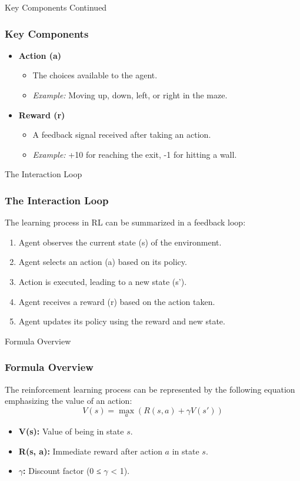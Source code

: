 \documentclass[aspectratio=169]{beamer}
\begin{document}
\begin{frame}[fragile]{Key Components Continued}
    \frametitle{Key Components}
    \begin{itemize}
        \item \textbf{Action (a)}
            \begin{itemize}
                \item The choices available to the agent.
                \item \textit{Example:} Moving up, down, left, or right in the maze.
            \end{itemize}
        \item \textbf{Reward (r)}
            \begin{itemize}
                \item A feedback signal received after taking an action.
                \item \textit{Example:} +10 for reaching the exit, -1 for hitting a wall.
            \end{itemize}
    \end{itemize}
\end{frame}

\begin{frame}[fragile]{The Interaction Loop}
    \frametitle{The Interaction Loop}
    The learning process in RL can be summarized in a feedback loop:
    \begin{enumerate}
        \item Agent observes the current state (s) of the environment.
        \item Agent selects an action (a) based on its policy.
        \item Action is executed, leading to a new state (s').
        \item Agent receives a reward (r) based on the action taken.
        \item Agent updates its policy using the reward and new state.
    \end{enumerate}
\end{frame}

\begin{frame}[fragile]{Formula Overview}
    \frametitle{Formula Overview}
    The reinforcement learning process can be represented by the following equation emphasizing the value of an action:
    \begin{equation}
        V(s) = \max_a \left( R(s, a) + \gamma V(s') \right)
    \end{equation}
    \begin{itemize}
        \item \textbf{V(s):} Value of being in state \(s\).
        \item \textbf{R(s, a):} Immediate reward after action \(a\) in state \(s\).
        \item \textbf{\(\gamma\):} Discount factor (0 ≤ \(\gamma\) < 1).
    \end{itemize}
\end{frame}
\end{document}
